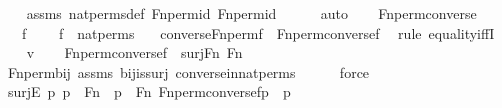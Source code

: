 \begin{isabellebody}
\ \ \isamarkupfalse%
\ assms\ nat{\isacharunderscore}{\kern0pt}perms{\isacharunderscore}{\kern0pt}def\ Fn{\isacharunderscore}{\kern0pt}perm{\isacharunderscore}{\kern0pt}id\ Fn{\isacharunderscore}{\kern0pt}perm{\isacharprime}{\kern0pt}{\isacharunderscore}{\kern0pt}id\ \isanewline
\ \ \ \isamarkupfalse%
\ auto{\isacharbrackleft}{\kern0pt}{}{\isacharbrackright}{\kern0pt}\isanewline
\ \ \isamarkupfalse%
%
\endisatagproof
{\isafoldproof}%
%
\isadelimproof
\isanewline
%
\endisadelimproof
\isanewline
{}\isamarkupfalse%
\ Fn{\isacharunderscore}{\kern0pt}perm{\isacharprime}{\kern0pt}{\isacharunderscore}{\kern0pt}converse\ {\isacharcolon}{\kern0pt}\ \isanewline
\ \ \ f\ \isanewline
\ \ \ {\isachardoublequoteopen}f\ {\isasymin}\ nat{\isacharunderscore}{\kern0pt}perms{\isachardoublequoteclose}\isanewline
\ \ \ {\isachardoublequoteopen}converse{\isacharparenleft}{\kern0pt}Fn{\isacharunderscore}{\kern0pt}perm{\isacharprime}{\kern0pt}{\isacharparenleft}{\kern0pt}f{\isacharparenright}{\kern0pt}{\isacharparenright}{\kern0pt}\ {\isacharequal}{\kern0pt}\ Fn{\isacharunderscore}{\kern0pt}perm{\isacharprime}{\kern0pt}{\isacharparenleft}{\kern0pt}converse{\isacharparenleft}{\kern0pt}f{\isacharparenright}{\kern0pt}{\isacharparenright}{\kern0pt}{\isachardoublequoteclose}\ \isanewline
%
\isadelimproof
%
\endisadelimproof
%
\isatagproof
{}\isamarkupfalse%
\ {\isacharparenleft}{\kern0pt}rule\ equality{\isacharunderscore}{\kern0pt}iffI{\isacharparenright}{\kern0pt}\isanewline
\ \ \isamarkupfalse%
\ v\isanewline
\isanewline
\ \ \isamarkupfalse%
\ {\isachardoublequoteopen}Fn{\isacharunderscore}{\kern0pt}perm{\isacharprime}{\kern0pt}{\isacharparenleft}{\kern0pt}converse{\isacharparenleft}{\kern0pt}f{\isacharparenright}{\kern0pt}{\isacharparenright}{\kern0pt}\ {\isasymin}\ surj{\isacharparenleft}{\kern0pt}Fn{\isacharcomma}{\kern0pt}\ Fn{\isacharparenright}{\kern0pt}{\isachardoublequoteclose}\ \isanewline
\ \ \ \ \isamarkupfalse%
\ Fn{\isacharunderscore}{\kern0pt}perm{\isacharprime}{\kern0pt}{\isacharunderscore}{\kern0pt}bij\ assms\ bij{\isacharunderscore}{\kern0pt}is{\isacharunderscore}{\kern0pt}surj\ converse{\isacharunderscore}{\kern0pt}in{\isacharunderscore}{\kern0pt}nat{\isacharunderscore}{\kern0pt}perms\isanewline
\ \ \ \ \isamarkupfalse%
\ force\ \isanewline
\ \ \isamarkupfalse%
\ \isamarkupfalse%
\ surjE{\isacharcolon}{\kern0pt}\ {\isachardoublequoteopen}{\isasymAnd}p{\isachardot}{\kern0pt}\ p\ {\isasymin}\ Fn\ {\isasymLongrightarrow}\ {\isasymexists}p{\isacharprime}{\kern0pt}\ {\isasymin}\ Fn{\isachardot}{\kern0pt}\ Fn{\isacharunderscore}{\kern0pt}perm{\isacharprime}{\kern0pt}{\isacharparenleft}{\kern0pt}converse{\isacharparenleft}{\kern0pt}f{\isacharparenright}{\kern0pt}{\isacharparenright}{\kern0pt}{\isacharbackquote}{\kern0pt}p{\isacharprime}{\kern0pt}\ {\isacharequal}{\kern0pt}\ p{\isachardoublequoteclose}\ \isamarkupfalse%

\end{isabellebody}
